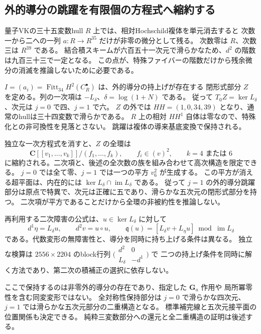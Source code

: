 \subsection{外的導分の跳躍を有限個の方程式へ縮約する}

量子VKの三十五変数hull $R$ 上では、相対Hochschild複体を単元消去すると
次数一から二への一列 $a:R\to R^{35}$ だけが非零の微分として残る。
次数零は $R$、次数三は $R^{39}$ である。
結合積スキームが六百五十一次元で滑らかなため、$d^2$ の階数は九百三十三で一定となる。
この点が、特殊ファイバーの階数だけから残余微分の消滅を推論しないために必要である。

$I=(a_i)=\operatorname{Fitt}_{34}H^2(C_R^\bullet)$ は、外的導分の持上げが存在する
閉形式部分 $Z$ を定める。列の一次項は $-L_\delta$、$\delta=\log(1+N)$ である。
従って $T_0Z=\ker L_\delta$、次元は $j=0$ で四、$j=1$ で六。
$Z$ の外では $HH=(1,0,34,39)$ となり、通常のhullは三十四変数で滑らかである。
$R$ 上の相対 $HH^1$ 自体は零なので、特殊化との非可換性を見落とさない。
跳躍は複体の導来基底変換で保持される。

独立な一次方程式を消すと、$Z$ の全環は
\[
 \mathbf C[[v_1,\ldots,v_k]]/(f_1,\ldots,f_k),\qquad f_i\in(v)^2,
 \qquad k=4\text{ または }6
\]
に縮約される。二次項と、後述の全次数の族を組み合わせて高次構造を限定できる。
$j=0$ では全て零、$j=1$ では一つの平方 $v_6^2$ が生成する。
この平方が消える超平面は、内在的には $\ker L_\delta\cap\operatorname{im}L_\delta$ である。
従って $j=1$ の外的導分跳躍部分は原点で特異で、次元は正確に五であり、滑らかな五次元の閉形式部分を持つ。
二次項が平方であることだけから全環の非被約性を推論しない。

再利用する二次障害の公式は、$u\in\ker L_\delta$ に対して
\[
 d^1\eta=L_\delta u,\qquad d^2v=u\circ u,
 \qquad
 \mathfrak q(u)=[L_\delta v+L_\eta u]\bmod\operatorname{im}L_\delta
\]
である。代数変形の無障害性と、導分を同時に持ち上げる条件は異なる。
独立な検算は $2556\times2204$ のblock行列
$\bigl(\begin{smallmatrix}d^2&0\\L_\delta&-d^1\end{smallmatrix}\bigr)$ で
二つの持上げ条件を同時に解く方法であり、第二次の積補正の選択に依存しない。

ここで保持するのは非零外的導分の存在であり、指定した $\mathbf G_a$ 作用や
局所冪零性を含む同変変形ではない。
全対称性保持部分は $j=0$ で滑らかな四次元、$j=1$ では滑らかな五次元部分の二重構造となる。
標準補完線と五次元接平面の位置関係も決定できる。
純粋三変数部分への還元と全二重構造の証明は後述する。
